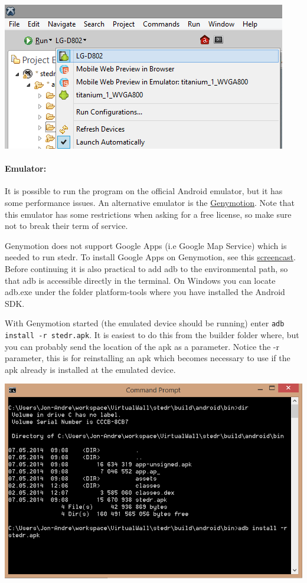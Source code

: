 \begin{center}
\includegraphics[scale=0.45]{guide/f4.png} 
\end{center}

\paragraph{Emulator:}
It is possible to run the program on the official Android emulator, but it has some performance issues. An alternative emulator is the \href{https://shop.genymotion.com/index.php?controller=order-opc}{Genymotion}. Note that this emulator has some restrictions when asking for a free license, so make sure not to break their term of service. 

Genymotion does not support Google Apps (i.e Google Map Service) which is needed to run stedr. To install Google Apps on Genymotion, see this \href{https://www.youtube.com/watch?v=iCRNqCXGNK0}{screencast}. Before continuing it is also practical to add adb to the environmental path, so that adb is accessible directly in the terminal. On Windows you can locate adb.exe under the folder platform-tools where you have installed the Android SDK. 

With Genymotion started (the emulated device should be running) enter \texttt{adb install -r stedr.apk}. It is easiest to do this from the builder folder where, but you can probably send the location of the apk as a parameter. Notice the -r parameter, this is for reinstalling an apk which becomes necessary to use if the apk already is installed at the emulated device.

\begin{center}
\includegraphics[scale=0.7]{guide/f45.png} 
\end{center}
\clearpage
